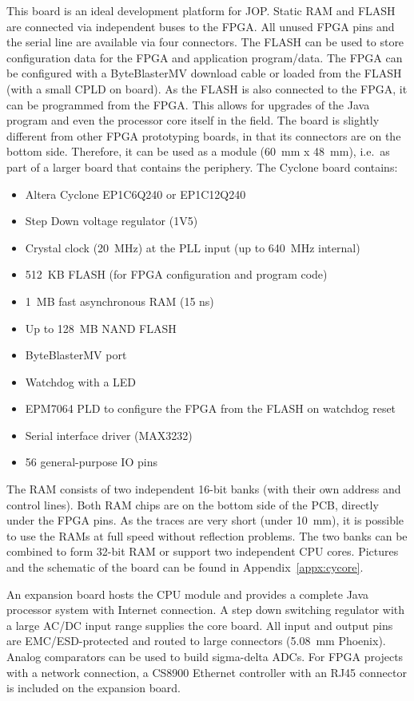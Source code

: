 This board is an ideal development platform for JOP. Static RAM and
FLASH are connected via independent buses to the FPGA. All unused
FPGA pins and the serial line are available via four connectors. The
FLASH can be used to store configuration data for the FPGA and
application program/data. The FPGA can be configured with a
ByteBlasterMV download cable or loaded from the FLASH (with a small
CPLD on board). As the FLASH is also connected to the FPGA, it can be
programmed from the FPGA. This allows for upgrades of the Java
program and even the processor core itself in the field. The board is
slightly different from other FPGA prototyping boards, in that its
connectors are on the bottom side. Therefore, it can be used as a
module (60~mm x 48~mm), i.e.\ as part of a larger board that contains
the periphery. The Cyclone board contains:
%
\begin{itemize}
\item Altera Cyclone EP1C6Q240 or EP1C12Q240
\item Step Down voltage regulator (1V5)
\item Crystal clock (20~MHz) at the PLL input (up to 640~MHz
    internal)
\item 512~KB FLASH (for FPGA configuration and program code)
\item 1~MB fast asynchronous RAM (15 ns)
\item Up to 128~MB NAND FLASH
\item ByteBlasterMV port
\item Watchdog with a LED
\item EPM7064 PLD to configure the FPGA from the FLASH on watchdog reset
\item Serial interface driver (MAX3232)
\item 56 general-purpose IO pins
\end{itemize}
%
The RAM consists of two independent 16-bit banks (with their own
address and control lines). Both RAM chips are on the bottom side of
the PCB, directly under the FPGA pins. As the traces are very short
(under 10~mm), it is possible to use the RAMs at full speed without
reflection problems. The two banks can be combined to form 32-bit
RAM or support two independent CPU cores. Pictures and the schematic
of the board can be found in Appendix~\ref{appx:cycore}.

An expansion board hosts the CPU module and provides a complete Java
processor system with Internet connection. A step down switching
regulator with a large AC/DC input range supplies the core board.
All input and output pins are EMC/ESD-protected and routed to large
connectors (5.08~mm Phoenix). Analog comparators can be used to
build sigma-delta ADCs. For FPGA projects with a network connection,
a CS8900 Ethernet controller with an RJ45 connector is included on
the expansion board.

